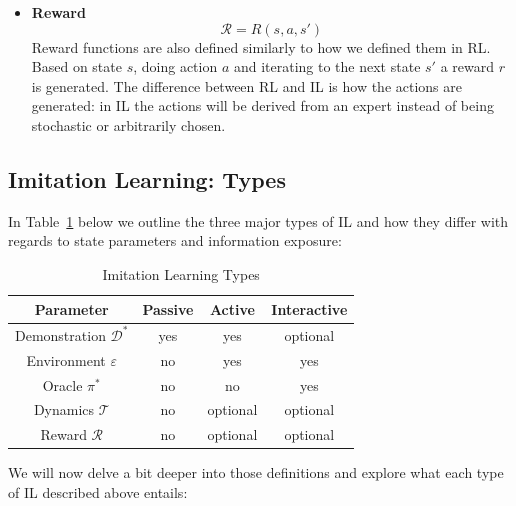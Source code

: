\documentclass[11pt]{article}
\begin{document}
\begin{itemize}
    \item \textbf{Reward}
    \begin{equation}
        \mathcal{R} = R(s,a,s')
    \end{equation}
    Reward functions are also defined similarly to how we defined them in RL. Based on state $s$, doing action $a$ and iterating to the next state $s'$ a reward $r$ is generated. The difference between RL and IL is how the actions are generated: in IL the actions will be derived from an expert instead of being stochastic or arbitrarily chosen. 


\end{itemize}

\subsection{Imitation Learning: Types}

In Table~\ref{tab:type} below we outline the three major types of IL and how they differ with regards to state parameters and information exposure: 

\begin{table}[h]
\centering
\begin{tabular}{|c|c|c|c|}
\hline
\textbf{Parameter} & \textbf{Passive} & \textbf{Active} & \textbf{Interactive} \\ \hline
Demonstration $\mathcal{D}^*$     & yes        & yes       & optional       \\ \hline
Environment $\varepsilon$ & no         & yes       & yes            \\ \hline
Oracle $\pi^*$           & no         & no        & yes            \\ \hline
Dynamics $\mathcal{T}$             & no         & optional  & optional       \\ \hline
Reward $\mathcal{R}$               & no         & optional  & optional       \\ \hline



\end{tabular}
\caption{Imitation Learning Types}
\label{tab:type}
\end{table}

We will now delve a bit deeper into those definitions and explore what each type of IL described above entails:
\end{document}

